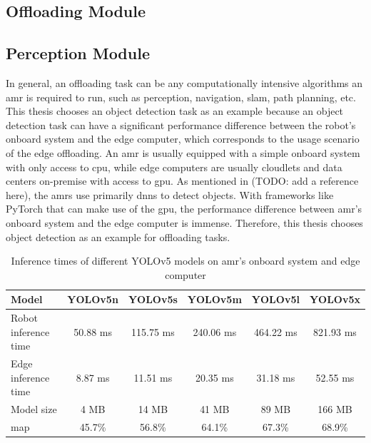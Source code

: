 \subsection{Offloading Module}


\subsection{Perception Module}



In general, an offloading task can be any computationally intensive algorithms an \gls{amr} is required to run, such as perception, navigation, \gls{slam}, path planning, etc. This thesis chooses an object detection task as an example because an object detection task can have a significant performance difference between the robot's onboard system and the edge computer, which corresponds to the usage scenario of the edge offloading. An \gls{amr} is usually equipped with a simple onboard system with only access to \gls{cpu}, while edge computers are usually cloudlets and data centers on-premise with access to \gls{gpu}. As mentioned in (TODO: add a reference here), the \glspl{amr} use primarily \glspl{dnn} to detect objects. With frameworks like PyTorch that can make use of the \gls{gpu}, the performance difference between \gls{amr}'s onboard system and the edge computer is immense. Therefore, this thesis chooses object detection as an example for offloading tasks. 

\begin{table}[htb]%
    \centering%
    \begin{tabular}{lccccc}
        \toprule
        Model &                     YOLOv5n &   YOLOv5s &   YOLOv5m &   YOLOv5l &   YOLOv5x \\
        \midrule
        Robot inference time &      50.88 ms &  115.75 ms & 240.06 ms & 464.22 ms & 821.93 ms  \\
        Edge inference time &       8.87 ms &   11.51 ms &  20.35 ms &  31.18 ms &  52.55 ms  \\
        Model size &                4 MB &      14 MB &     41 MB &     89 MB &     166 MB    \\
        \gls{map} &                 45.7\% &    56.8\% &    64.1\% &    67.3\% &    68.9\%  \\
        \bottomrule
    \end{tabular}
    \caption{Inference times of different YOLOv5 models on \gls{amr}'s onboard system and edge computer}
    \label{tab:inference_time}%
\end{table}

